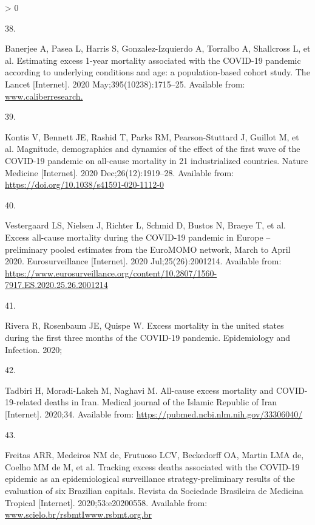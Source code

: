 \documentclass[
]{article}
\newlength{\cslhangindent}
\newlength{\csllabelwidth}
\newenvironment{CSLReferences}[2] %
 {%
  \setlength{\parindent}{0pt}
  \ifodd #1 \everypar{\setlength{\hangindent}{\cslhangindent}}\ignorespaces\fi
  \ifnum #2 > 0
  \setlength{\parskip}{#2\baselineskip}
  \fi
 }%
 {}
\newcommand{\CSLLeftMargin}[1]{\parbox[t]{\csllabelwidth}{#1}}
\newcommand{\CSLRightInline}[1]{\parbox[t]{\linewidth - \csllabelwidth}{#1}\break}
\begin{document}
\begin{CSLReferences}{0}{0}
\leavevmode\hypertarget{ref-Banerjee2020}{}%
\CSLLeftMargin{38. }
\CSLRightInline{Banerjee A, Pasea L, Harris S, Gonzalez-Izquierdo A, Torralbo A, Shallcross L, et al. {Estimating excess 1-year mortality associated with the COVID-19 pandemic according to underlying conditions and age: a population-based cohort study}. The Lancet {[}Internet{]}. 2020 May;395(10238):1715--25. Available from: \href{https://www.caliberresearch.}{www.caliberresearch.}}

\leavevmode\hypertarget{ref-Kontis2020}{}%
\CSLLeftMargin{39. }
\CSLRightInline{Kontis V, Bennett JE, Rashid T, Parks RM, Pearson-Stuttard J, Guillot M, et al. {Magnitude, demographics and dynamics of the effect of the first wave of the COVID-19 pandemic on all-cause mortality in 21 industrialized countries}. Nature Medicine {[}Internet{]}. 2020 Dec;26(12):1919--28. Available from: \url{https://doi.org/10.1038/s41591-020-1112-0}}

\leavevmode\hypertarget{ref-Vestergaard2020}{}%
\CSLLeftMargin{40. }
\CSLRightInline{Vestergaard LS, Nielsen J, Richter L, Schmid D, Bustos N, Braeye T, et al. {Excess all-cause mortality during the COVID-19 pandemic in Europe -- preliminary pooled estimates from the EuroMOMO network, March to April 2020}. Eurosurveillance {[}Internet{]}. 2020 Jul;25(26):2001214. Available from: \url{https://www.eurosurveillance.org/content/10.2807/1560-7917.ES.2020.25.26.2001214}}

\leavevmode\hypertarget{ref-Rivera2020}{}%
\CSLLeftMargin{41. }
\CSLRightInline{Rivera R, Rosenbaum JE, Quispe W. {Excess mortality in the united states during the first three months of the COVID-19 pandemic}. Epidemiology and Infection. 2020; }

\leavevmode\hypertarget{ref-Tadbiri2020}{}%
\CSLLeftMargin{42. }
\CSLRightInline{Tadbiri H, Moradi-Lakeh M, Naghavi M. {All-cause excess mortality and COVID-19-related deaths in Iran}. Medical journal of the Islamic Republic of Iran {[}Internet{]}. 2020;34. Available from: \url{https://pubmed.ncbi.nlm.nih.gov/33306040/}}

\leavevmode\hypertarget{ref-Freitas2020}{}%
\CSLLeftMargin{43. }
\CSLRightInline{Freitas ARR, Medeiros NM de, Frutuoso LCV, Beckedorff OA, Martin LMA de, Coelho MM de M, et al. {Tracking excess deaths associated with the COVID-19 epidemic as an epidemiological surveillance strategy-preliminary results of the evaluation of six Brazilian capitals}. Revista da Sociedade Brasileira de Medicina Tropical {[}Internet{]}. 2020;53:e20200558. Available from: \href{https://www.scielo.br/rsbmtIwww.rsbmt.org.br}{www.scielo.br/rsbmtIwww.rsbmt.org.br}}


\end{CSLReferences}
\end{document}
